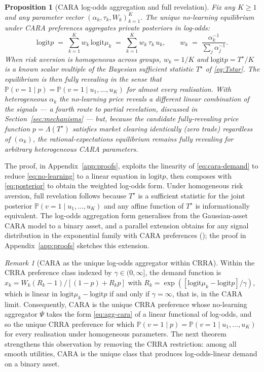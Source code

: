 \documentclass[12pt,letterpaper]{article}
\newtheorem{proposition}{Proposition}
\theoremstyle{definition}
\theoremstyle{remark}
\newtheorem{remark}{Remark}
\newcommand{\PP}{\mathbb{P}}
\newcommand{\Lam}{\Lambda}            %
\newcommand{\logit}{\mathrm{logit}}
\newcommand{\Tstar}{T^{\!\star}}
\newcommand{\1}{\mathbf{1}}
\begin{document}
\begin{proposition}[CARA log-odds aggregation and full revelation]\label{prop:cara}
Fix any $K\geq 1$ and any parameter vector
$(\alpha_{k},\tau_{k},W_{k})_{k=1}^{K}$. The unique no-learning equilibrium
under CARA preferences aggregates private posteriors in log-odds:
\begin{equation}
   \logit p \;=\; \sum_{k=1}^{K} w_{k}\,\logit\mu_{k}
              \;=\; \sum_{k=1}^{K} w_{k}\,\tau_{k}\,u_{k},
   \qquad w_{k} \;=\; \frac{\alpha^{-1}_{k}}{\sum_{j}\alpha^{-1}_{j}}.
\label{eq:cara-clearing}
\end{equation}
When risk aversion is homogeneous across groups, $w_{k}=1/K$ and
$\logit p=\Tstar/K$ is a known scalar multiple of the Bayesian sufficient
statistic $\Tstar$ of \eqref{eq:Tstar}. The equilibrium is then fully
revealing in the sense that
$\PP(v=1\mid p)=\PP(v=1\mid u_{1},\ldots,u_{K})$ for almost every realisation.
With heterogeneous $\alpha_{k}$ the no-learning price reveals a different
linear combination of the signals --- a fourth route to partial revelation,
discussed in Section~\ref{sec:mechanisms} --- but, because the candidate
fully-revealing price function $p=\Lam(\Tstar)$ satisfies market clearing
identically (zero trade) regardless of $(\alpha_{k})$, the
\emph{rational-expectations} equilibrium remains fully revealing for
arbitrary heterogeneous CARA parameters.
\end{proposition}

The proof, in Appendix~\ref{app:proofs}, exploits the linearity of
\eqref{eq:cara-demand} to reduce \eqref{eq:no-learning} to a linear equation
in $\logit p$, then composes with \eqref{eq:posterior} to obtain the
weighted log-odds form. Under homogeneous risk aversion, full revelation
follows because $\Tstar$ is a sufficient statistic for the joint posterior
$\PP(v=1\mid u_{1},\ldots,u_{K})$ and any affine function of $\Tstar$ is
informationally equivalent. The log-odds aggregation form generalises
\citet{DeMarzoSkiadas1998} from the Gaussian-asset CARA model to a binary
asset, and a parallel extension obtains for any signal distribution in the
exponential family with CARA preferences (\citealp{BreonDrish2015}); the
proof in Appendix~\ref{app:proofs} sketches this extension.

\begin{remark}[CARA as the unique log-odds aggregator within CRRA]\label{rem:unique-cara}
Within the CRRA preference class indexed by $\gamma\in(0,\infty]$, the
demand function is $x_{k}=W_{k}(R_{k}-1)/[(1-p)+R_{k}p]$ with
$R_{k}=\exp([\logit\mu_{k}-\logit p]/\gamma)$, which is linear in
$\logit\mu_{k}-\logit p$ if and only if $\gamma=\infty$, that is, in the
CARA limit. Consequently, CARA is the unique CRRA preference whose
no-learning aggregator $\Psi$ takes the form \eqref{eq:agg-cara} of a
linear functional of log-odds, and so the unique CRRA preference for which
\(\PP(v=1\mid p)=\PP(v=1\mid u_{1},\ldots,u_{K})\) for every realisation
under homogeneous parameters. The next theorem strengthens this
observation by removing the CRRA restriction: among all smooth utilities,
CARA is the unique class that produces log-odds-linear demand on a
binary asset.
\end{remark}
\end{document}
